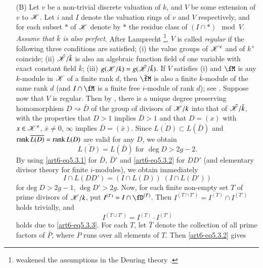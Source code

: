 \begin{itemize}
\item[(B)] Let $v$ be a non-trivial discrete valuation of $k$, and $V$ be some extension of $v$ to $\mathscr{K}$. Let $i$ and $I$ denote the valuation rings of $v$ and $V$ respectively, and for each subset $\ast$ of $\mathscr{K}$ denote by $\ast$ the residue class of $(I \cap \ast) \mod V$. \textit{Assume that $\bar{k}$ is also perfect}. After Lamprecht \cite{art6-key11}\footnote{\cite{art6-key11} weakened the assumptions in the Deuring theory \cite{art6-key2}.}, $V$ is called \textit{regular} if the following three conditions are satisfied; (i) the value groups of $\mathscr{K}^\times$ and of $k^\times$ coincide; (ii) $\bar{\mathscr{K}}/ \bar{k}$ is also an algebraic function field of one variable with exact constant field $\bar{k}$; (iii) $g (\mathscr{K}/ k) = g (\bar{\mathscr{K}}/ \bar{k})$. If $V$ satisfies (i) and $\fM$ is any $k$-module in $\mathscr{K}$ of a finite rank $d$, then $\bar{\fM}$ is also a finite $\bar{k}$-module of the same rank $d$ (and $I \cap \fM$ is a finite free $i$-module of rank $d$); see \cite{art6-key11}. Suppose now that $V$ is regular. Then by \cite{art6-key11}, there is a unique degree preserving homomorphism $D \rightsquigarrow \bar{D}$ of the group of divisors of $\mathscr{K} / k$ into that of $\bar{\mathscr{K}}/ \bar{k}$, with the properties that $D >1$ implies $\bar{D} > 1$ and that $D = (x)$ with $x \in \mathscr{K}^\times$, $\bar{x} \neq 0$, $\infty$ implies $\bar{D} = (\bar{x})$. Since $\overline{L(D)} \subset L(\bar{D})$ and $\operatorname{rank}\overline{L(D)} = \operatorname{rank} L(D)$ are valid for any $D$, we obtain
\begin{equation}
\overline{L(D)} = L (\bar{D}) \text{ for } \deg D > 2 g - 2. 
\label{art6-eq5.3.2}
\end{equation}
By using \eqref{art6-eq5.3.1} for $\bar{D}$, $\bar{D}'$ and \eqref{art6-eq5.3.2} for $DD'$ (and elementary divisor theory for finite $i$-modules), we obtain immediately
\begin{equation}
I \cap L (DD') = (I \cap L (D)) \; (I \cap L (D')) \label{art6-eq5.3.3}
\end{equation}
for\pageoriginale $\deg D > 2g -1$, $\deg D' > 2g$. Now, for each finite non-empty set $T$ of prime divisors of $\mathscr{K}/k$, put $I^{(T)} = I \cap \fD^{(T)}$. Then $I^{(T \cap T')} = I^{(T)} \cap I^{(T')}$ holds trivially, and 
\begin{equation}
I^{(T \cup T')} = I^{(T)} \cdot I^{(T')} \label{art6-eq5.3.4}
\end{equation}
holds due to \eqref{art6-eq5.3.3}. For each $T$, let $\bar{T}$ denote the collection of all prime factors of $\bar{P}$, where $P$ runs over all elements of $T$. Then \eqref{art6-eq5.3.2} gives

\end{itemize}
